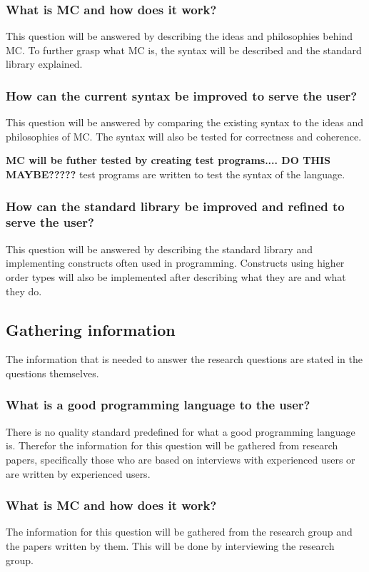 \subsubsection{What is MC and how does it work?}
This question will be answered by describing the ideas and philosophies behind MC.
To further grasp what MC is, the syntax will be described and the standard library explained.

\subsubsection{How can the current syntax be improved to serve the user?}
This question will be answered by comparing the existing syntax to the ideas and philosophies of MC.
The syntax will also be tested for correctness and coherence.

\textbf{MC will be futher tested by creating test programs.... DO THIS MAYBE?????}
test programs are written to test the syntax of the language.

\subsubsection{How can the standard library be improved and refined to serve the user?}
This question will be answered by describing the standard library and implementing constructs often used in programming.
Constructs using higher order types will also be implemented after describing what they are and what they do.



\subsection{Gathering information}
The information that is needed to answer the research questions are stated in the questions themselves.


\subsubsection{What is a good programming language to the user?}
There is no quality standard predefined for what a good programming language is.
Therefor the information for this question will be gathered from research papers, specifically those who are based on interviews with experienced users or are written by experienced users.

\subsubsection{What is MC and how does it work?}
The information for this question will be gathered from the research group and the papers written by them.
This will be done by interviewing the research group.

